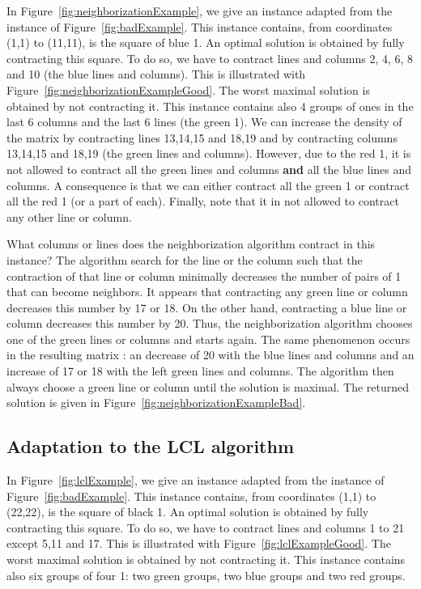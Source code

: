 In Figure~\ref{fig:neighborizationExample}, we give an instance adapted from the instance of Figure~\ref{fig:badExample}. This instance contains, from coordinates (1,1) to (11,11), is the square of blue 1. An optimal solution is obtained by fully contracting this square. To do so, we have to contract lines and columns 2, 4, 6, 8 and 10 (the blue lines and columns). This is illustrated with Figure~\ref{fig:neighborizationExampleGood}. The worst maximal solution is obtained by not contracting it. This instance contains also 4 groups of ones in the last 6 columns and the last 6 lines (the green 1). We can increase the density of the matrix by contracting lines 13,14,15 and 18,19 and by contracting columns 13,14,15 and 18,19 (the green lines and columns). However, due to the red 1, it is not allowed to contract all the green lines and columns \textbf{and} all the blue lines and columns. A consequence is that we can either contract all the green 1 or contract all the red 1 (or a part of each). Finally, note that it in not allowed to contract any other line or column.

What columns or lines does the neighborization algorithm contract in this instance? The algorithm search for the line or the column such that the contraction of that line or column minimally decreases the number of pairs of 1 that can become neighbors. It appears that contracting any green line or column decreases this number by 17 or 18. On the other hand, contracting a blue line or column decreases this number by 20. Thus, the neighborization algorithm chooses one of the green lines or columns and starts again. The same phenomenon occurs in the resulting matrix : an decrease of 20 with the blue lines and columns and an increase of 17 or 18 with the left green lines and columns. The algorithm then always choose a green line or column until the solution is maximal. The returned solution is given in Figure~\ref{fig:neighborizationExampleBad}.


\renewcommand{\gridsize}{0.5}




\subsection{Adaptation to the LCL algorithm}
\renewcommand{\gridsize}{0.35}

In Figure~\ref{fig:lclExample}, we give an instance adapted from the instance of Figure~\ref{fig:badExample}. This instance contains, from coordinates (1,1) to (22,22), is the square of black 1. An optimal solution is obtained by fully contracting this square. To do so, we have to contract lines and columns 1 to 21 except 5,11 and 17. This is illustrated with Figure~\ref{fig:lclExampleGood}. The worst maximal solution is obtained by not contracting it. This instance contains also six groups of four 1: two green groups, two blue groups and two red groups. 

